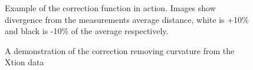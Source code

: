 \documentclass[]{article}
\begin{document}
{\begin{figure}[htb]
	\centering     %
	 \;
	\caption{Example of the correction function in action. Images show divergence from the measurements average distance, white is +10\% and black is -10\% of the average respectively.}
	\label{fig:beforeAfter}
\end{figure}
\begin{figure}[htb]
	\centering     %
	 \;
	\caption{A demonstration of the correction removing curvature from the Xtion data}
	\label{fig:outputTest}
\end{figure}

}
\end{document}
